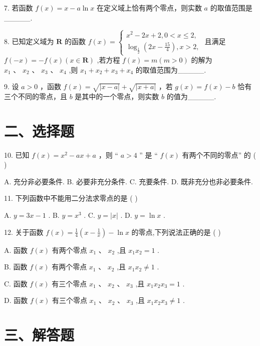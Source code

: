 7. 若函数 $f\left( x\right)  = x - a\ln x$ 在定义域上恰有两个零点，则实数 $a$ 的取值范围是\_\_\_\_\_.

8. 已知定义域为 $\mathbf{R}$ 的函数 $f\left( x\right)  = \left\{  \begin{array}{l} {x}^{2} - {2x} + 2,0 < x \leq  2, \\  {\log }_{\frac{1}{2}}\left( {{2x} - \frac{15}{4}}\right) ,x > 2, \end{array}\right.$ 且满足 $f\left( {-x}\right)  =  - f\left( x\right) \left( {x \in  \mathbf{R}}\right)$ ,若方程 $f\left( x\right)  = m\left( {m > 0}\right)$ 的解为 ${x}_{1}\text{ 、 }{x}_{2}\text{ 、 }{x}_{3}\text{ 、 }{x}_{4}$ ,则 ${x}_{1} + {x}_{2} + {x}_{3} + {x}_{4}$ 的取值范围为\_\_\_\_\_.

9. 设 $a > 0$ ，函数 $f\left( x\right)  = \sqrt{\left| x - a\right| } + \sqrt{\left| x + a\right| }$ ，若 $g\left( x\right)  = f\left( x\right)  - b$ 恰有三个不同的零点，且 $b$ 是其中的一个零点，则实数 $b$ 的值为\_\_\_\_\_.

\section*{二、选择题}

10. 已知 $f\left( x\right)  = {x}^{2} - {ax} + a$ ，则 “ $a > 4$ ” 是 “ $f\left( x\right)$ 有两个不同的零点” 的 ( )

A. 充分非必要条件. B. 必要非充分条件. C. 充要条件. D. 既非充分也非必要条件.

11. 下列函数中不能用二分法求零点的是 ( )

A. $y = {3x} - 1$ . B. $y = {x}^{3}$ . C. $y = \left| x\right|$ . D. $y = \ln x$ .

12. 关于函数 $f\left( x\right)  = \frac{1}{4}\left( {x - \frac{1}{x}}\right)  - \ln x$ 的零点,下列说法正确的是 ( )

A. 函数 $f\left( x\right)$ 有两个零点 ${x}_{1}\text{ 、 }{x}_{2}$ ,且 ${x}_{1}{x}_{2} = 1$ .

B. 函数 $f\left( x\right)$ 有两个零点 ${x}_{1}\text{ 、 }{x}_{2}$ ,且 ${x}_{1}{x}_{2} \neq  1$ .

C. 函数 $f\left( x\right)$ 有三个零点 ${x}_{1}\text{ 、 }{x}_{2}\text{ 、 }{x}_{3}$ ,且 ${x}_{1}{x}_{2}{x}_{3} = 1$ .

D. 函数 $f\left( x\right)$ 有三个零点 ${x}_{1}\text{ 、 }{x}_{2}\text{ 、 }{x}_{3}$ ,且 ${x}_{1}{x}_{2}{x}_{3} \neq  1$ .

\section*{三、解答题}


